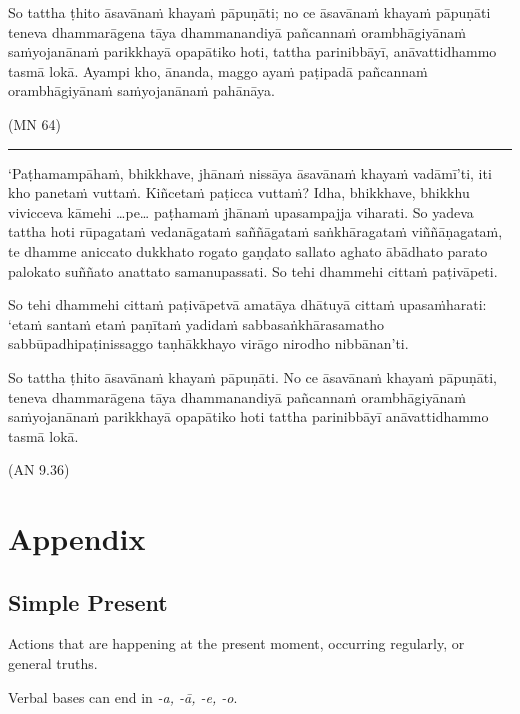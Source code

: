\documentclass[11pt,oneside]{memoir}
\begin{document}
So tattha ṭhito āsavānaṁ khayaṁ pāpuṇāti; no ce āsavānaṁ khayaṁ pāpuṇāti teneva
dhammarāgena tāya dhammanandiyā pañcannaṁ orambhāgiyānaṁ saṁyojanānaṁ parikkhayā
opapātiko hoti, tattha parinibbāyī, anāvattidhammo tasmā lokā. Ayampi kho,
ānanda, maggo ayaṁ paṭipadā pañcannaṁ orambhāgiyānaṁ saṁyojanānaṁ pahānāya.

(MN 64)

\noindent\rule{\textwidth}{0.5pt}

‘Paṭhamampāhaṁ, bhikkhave, jhānaṁ nissāya āsavānaṁ khayaṁ vadāmī’ti, iti kho
panetaṁ vuttaṁ. Kiñcetaṁ paṭicca vuttaṁ? Idha, bhikkhave, bhikkhu vivicceva
kāmehi …pe… paṭhamaṁ jhānaṁ upasampajja viharati. So yadeva tattha hoti
rūpagataṁ vedanāgataṁ saññāgataṁ saṅkhāragataṁ viññāṇagataṁ, te dhamme aniccato
dukkhato rogato gaṇḍato sallato aghato ābādhato parato palokato suññato anattato
samanupassati. So tehi dhammehi cittaṁ paṭivāpeti.

So tehi dhammehi cittaṁ paṭivāpetvā amatāya dhātuyā cittaṁ upasaṁharati: ‘etaṁ
santaṁ etaṁ paṇītaṁ yadidaṁ sabbasaṅkhārasamatho sabbūpadhipaṭinissaggo
taṇhākkhayo virāgo nirodho nibbānan’ti.

So tattha ṭhito āsavānaṁ khayaṁ pāpuṇāti. No ce āsavānaṁ khayaṁ
pāpuṇāti, teneva dhammarāgena tāya dhammanandiyā pañcannaṁ orambhāgiyānaṁ
saṁyojanānaṁ parikkhayā opapātiko hoti tattha parinibbāyī anāvattidhammo tasmā
lokā.

(AN 9.36)

\chapter{Appendix}
\label{sec:org618e52a}
\section{Simple Present}
\label{sec:org54ea055}

Actions that are happening at the present moment, occurring regularly, or general truths.

Verbal bases can end in \emph{-a, -ā, -e, -o}.
\end{document}
